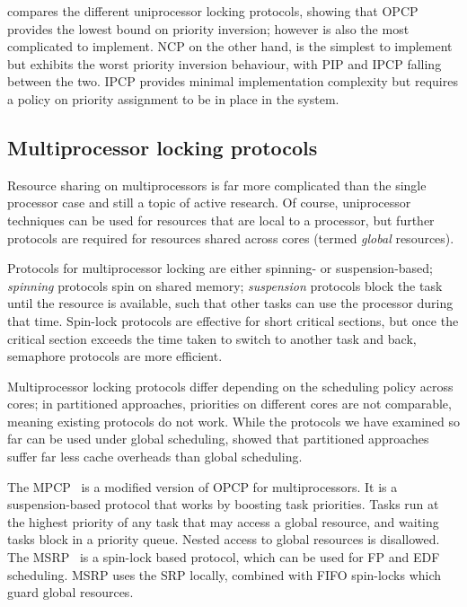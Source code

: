  compares the different uniprocessor locking protocols, showing that \gls{OPCP}
provides the lowest bound on priority inversion; however is also the most complicated to implement.
\gls{NCP} on the other hand, is the simplest to implement but exhibits the worst priority inversion
behaviour, with \gls{PIP} and \gls{IPCP} falling between the two.  \gls{IPCP} provides minimal
implementation complexity but requires a policy on priority assignment to be in place in the system.

\subsection{Multiprocessor locking protocols}

Resource sharing on multiprocessors is far more complicated than the single processor case and still
a topic of active research. Of course, uniprocessor techniques can be used for resources that are
local to a processor, but further protocols are required for resources shared across cores (termed
\emph{global} resources).

Protocols for multiprocessor locking are either spinning- or suspension-based;
\emph{spinning} protocols spin on shared memory; \emph{suspension} protocols block the
task until the resource is available, such that other tasks can use the processor during that time.
Spin-lock protocols are effective for short critical sections, but once the critical section exceeds
the time taken to switch to another task and back, semaphore protocols are more efficient. 

Multiprocessor locking protocols differ depending on the scheduling policy across cores; in
partitioned approaches, priorities on different cores are not comparable, meaning existing protocols
do not work. While the protocols we have examined so far can be used under global scheduling,
\citet{Brandenburg:phd} showed that partitioned approaches suffer far less cache overheads than
global scheduling. 

The \gls{MPCP}~\citep{Rajkumar_90} is a modified version of \gls{OPCP} for multiprocessors. It is a
suspension-based protocol that works by boosting task priorities. Tasks run at the highest priority
of any task that may access a global resource, and waiting tasks block in a priority queue. Nested
access to global resources is disallowed. The \gls{MSRP}~\citep{Gai_DL_03} is a spin-lock based
protocol, which can be used for \gls{FP} and \gls{EDF} scheduling. \gls{MSRP} uses the \gls{SRP} locally,
combined with \gls{FIFO} spin-locks which guard global resources. 

